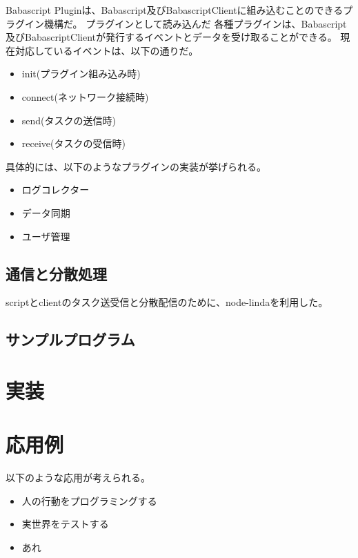 Babascript
Pluginは、Babascript及びBabascriptClientに組み込むことのできるプラグイン機構だ。
プラグインとして読み込んだ
各種プラグインは、Babascript及びBabascriptClientが発行するイベントとデータを受け取ることができる。
現在対応しているイベントは、以下の通りだ。

\begin{itemize}
\itemsep1pt\parskip0pt
\item
  init(プラグイン組み込み時)
\item
  connect(ネットワーク接続時)
\item
  send(タスクの送信時)
\item
  receive(タスクの受信時)
\end{itemize}

具体的には、以下のようなプラグインの実装が挙げられる。

\begin{itemize}
\itemsep1pt\parskip0pt
\item
  ログコレクター
\item
  データ同期
\item
  ユーザ管理
\end{itemize}

\subsection{通信と分散処理}\label{ux901aux4fe1ux3068ux5206ux6563ux51e6ux7406}

scriptとclientのタスク送受信と分散配信のために、node-linda\cite{linda}を利用した。

\subsection{サンプルプログラム}\label{ux30b5ux30f3ux30d7ux30ebux30d7ux30edux30b0ux30e9ux30e0}

\section{実装}\label{ux5b9fux88c5}

\section{応用例}\label{ux5fdcux7528ux4f8b}

以下のような応用が考えられる。

\begin{itemize}
  \item 人の行動をプログラミングする
  \item 実世界をテストする
  \item あれ
\end{itemize}

